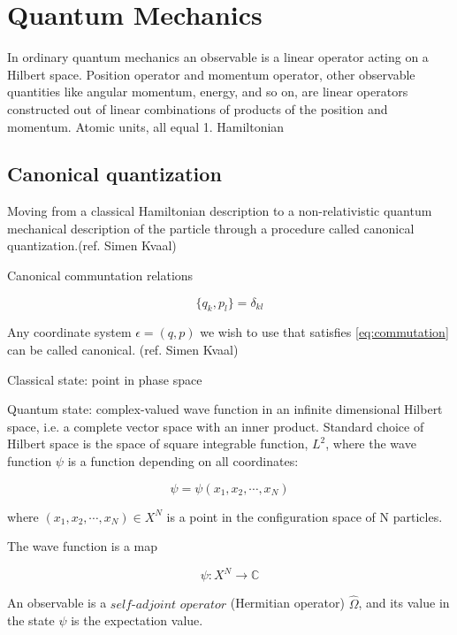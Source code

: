 \section{Quantum Mechanics}

In ordinary quantum mechanics an observable is a linear operator acting on a Hilbert space. Position operator and momentum operator, other observable quantities like angular momentum, energy, and so on, are linear operators constructed out of linear combinations of products of the position and momentum.\cite{kvaal}
Atomic units, all equal 1.
Hamiltonian 

\subsection{Canonical quantization}

Moving from a classical Hamiltonian description to a non-relativistic quantum mechanical description of the particle through a procedure called canonical quantization.(ref. Simen Kvaal)

Canonical communtation relations 

\begin{equation} \label{eq:commutation}
\{q_k, p_l\} = \delta_{kl}
\end{equation}

Any coordinate system $\epsilon = (q,p)$ we wish to use that satisfies \ref{eq:commutation} can be called canonical. (ref. Simen Kvaal)

Classical state: point in phase space

Quantum state: complex-valued wave function in an infinite dimensional Hilbert space, i.e. a complete vector space with an inner product.
Standard choice of Hilbert space is the space of square integrable function, $L^2$, where the wave function $\psi$ is a function depending on all coordinates:

\begin{equation}
\psi = \psi (x_1, x_2, \cdots, x_N)
\end{equation}

where $(x_1, x_2, \cdots , x_N) \in X^N$ is a point in the configuration space of N particles. 

The wave function is a map 

\begin{equation}
\psi : X^N \longrightarrow \mathbb{C}
\end{equation}

An observable is a $\textit{self-adjoint operator}$ (Hermitian operator) $\hat{\Omega}$, and its value in the state $\psi$ is the expectation value. 

